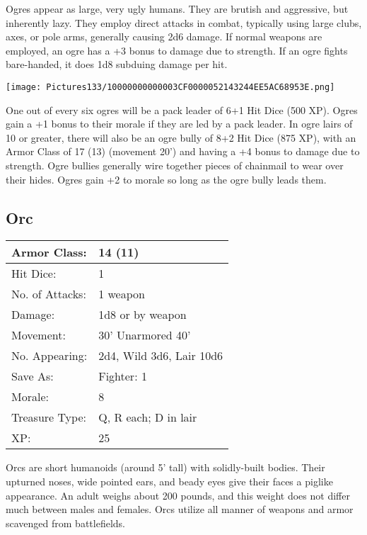 \documentclass[a4paper,twoside,openany,10pt]{book}
\begin{document}
\begin{multicols}{2}
Ogres appear as large, very ugly humans. They are brutish and aggressive, but inherently lazy. They employ direct attacks in combat, typically using large clubs, axes, or pole arms, generally causing 2d6 damage. If normal weapons are employed, an ogre has a +3 bonus to damage due to strength. If an ogre fights bare-handed, it does 1d8 subduing damage per hit.

\begin{center} \texttt{[image: Pictures133/10000000000003CF0000052143244EE5AC68953E.png]} \end{center}

One out of every six ogres will be a pack leader of 6+1 Hit Dice (500 XP). Ogres gain a +1 bonus to their morale if they are led by a pack leader. In ogre lairs of 10 or greater, there will also be an ogre bully of 8+2 Hit Dice (875 XP), with an Armor Class of 17 (13) (movement 20') and having a +4 bonus to damage due to strength. Ogre bullies generally wire together pieces of chainmail to wear over their hides. Ogres gain +2 to morale so long as the ogre bully leads them.

\subsection*{Orc}\label{orc}

\begin{tabularx}{0.50\textwidth}{@{}lX@{}}
Armor Class: & 14 (11) \\\hline
Hit Dice: & 1 \\\hline
No. of Attacks: & 1 weapon \\\hline
Damage: & 1d8 or by weapon \\\hline
Movement: & 30' Unarmored 40' \\\hline
No. Appearing: & 2d4, Wild 3d6, Lair 10d6 \\\hline
Save As: & Fighter: 1 \\\hline
Morale: & 8 \\\hline
Treasure Type: & Q, R each; D in lair \\\hline
XP: & 25 \\\hline
\end{tabularx}\medskip

Orcs are short humanoids (around 5' tall) with solidly-built bodies. Their upturned noses, wide pointed ears, and beady eyes give their faces a piglike appearance. An adult weighs about 200 pounds, and this weight does not differ much between males and females. Orcs utilize all manner of weapons and armor scavenged from battlefields.



\end{multicols}
\end{document}
